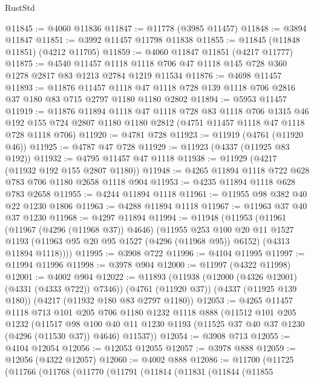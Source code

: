 \begin{lexlean}{RustStd}
\begin{coremodule}
@11845 := @4060 @11836
@11847 := @11778 (@3985 @11457)
@11848 := @3894 @11847
@11851 := @3992 @11457 @11798 @11838
@11855 := @11845 (@11848 @11851) (@4212 @11705)
@11859 := @4060 @11847 @11851 (@4217 @11777)
@11875 := @4540
    @11457
    @1118
    @1118
    @706
    @47
    @1118
    @145
    @728
    @360
    @1278
    @2817
    @83
    @1213
    @2784
    @1219
    @11534
@11876 := @4698 @11457
@11893 := @11876
    @11457
    @1118
    @47
    @1118
    @728
    @139
    @1118
    @706
    @2816
    @37
    @180
    @83
    @715
    @2797
    @1180
    @1180
    @2802
@11894 := @5953 @11457
@11919 := @11876
    @11894
    @1118
    @47
    @1118
    @728
    @83
    @1118
    @706
    @1315
    @46
    @192
    @155
    @724
    @2807
    @1180
    @1180
    @2812
    (@4751 @11457 @1118 @47 @1118 @728 @1118 @706)
@11920 := @4781 @728
@11923 := @11919 (@4761 (@11920 @46))
@11925 := @4787 @47 @728
@11929 := @11923 (@4337 (@11925 @83 @192))
@11932 := @4795 @11457 @47 @1118
@11938 := @11929 (@4217 (@11932 @192 @155 @2807 @1180))
@11948 := @4265 @11894 @1118 @722 @628 @783 @706 @1180 @2658 @1118 @904
@11953 := @4235 @11894 @1118 @628 @783 @2658
@11955 := @4244 @11894 @1118
@11961 := @11955 @98 @382 @40 @22 @1230 @1806
@11963 := @4288 @11894 @1118
@11967 := @11963 @37 @40 @37 @1230
@11968 := @4297 @11894
@11994 := @11948
    (@11953
      (@11961
        (@11967 (@4296 (@11968 @37)) @4646)
        (@11955
          @253
          @100
          @20
          @11
          @1527
          @1193
          (@11963 @95 @20 @95 @1527 (@4296 (@11968 @95)) @6152)
          (@4313 @11894 @1118))))
@11995 := @3908 @722
@11996 := @4104 @11995
@11997 := @11994 @11996
@11998 := @3978 @904
@12000 := @11997 (@4322 @11998)
@12001 := @4002 @904
@12022 := @11893
    (@11938 (@12000 (@4326 @12001) (@4331 (@4333 @722)) @7346))
    (@4761 (@11920 @37))
    (@4337 (@11925 @139 @180))
    (@4217 (@11932 @180 @83 @2797 @1180))
@12053 := @4265
    @11457
    @1118
    @713
    @101
    @205
    @706
    @1180
    @1232
    @1118
    @888
    (@11512
      @101
      @205
      @1232
      (@11517
        @98
        @100
        @40
        @11
        @1230
        @1193
        (@11525 @37 @40 @37 @1230 (@4296 (@11530 @37)) @4646)
        @11537))
@12054 := @3908 @713
@12055 := @4104 @12054
@12056 := @12053 @12055
@12057 := @3978 @888
@12059 := @12056 (@4322 @12057)
@12060 := @4002 @888
@12086 := @11700
    (@11725
      (@11766
        (@11768
          (@11770
            (@11791
              (@11814
                (@11831
                  (@11844
                    (@11855

\end{coremodule}
\end{lexlean}
